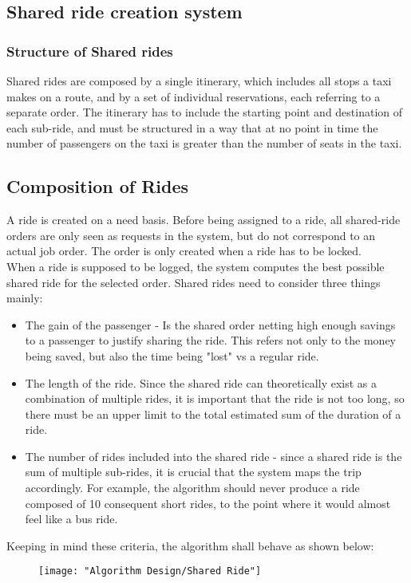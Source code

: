 \newpage
\subsection{Shared ride creation system}
	\subsubsection{Structure of Shared rides}
		Shared rides are composed by a single itinerary, which includes all stops a taxi makes on a route, and by a set of individual reservations, each referring to a separate order.
		The itinerary has to include the starting point and destination of each sub-ride, and must be structured in a way that at no point in time the number of passengers on the taxi is greater than
		the number of seats in the taxi.\\
	\subsection{Composition of Rides}
		A ride is created on a need basis. Before being assigned to a ride, all shared-ride orders are only seen as requests in the system, but do not correspond to an actual job order.
		The order is only created when a ride has to be locked.\\
		When a ride is supposed to be logged, the system computes the best possible shared ride for the selected order. Shared rides need to consider three things mainly:
		\begin{itemize}
		\item The gain of the passenger - Is the shared order netting high enough savings to a passenger to justify sharing the ride. This refers not only to the money being saved, but
		also the time being "lost" vs a regular ride.
		\item The length of the ride. Since the shared ride can theoretically exist as a combination of multiple rides, it is important that the ride is not too long, so there must be an upper limit
		to the total estimated sum of the duration of a ride.
		\item The number of rides included into the shared ride - since a shared ride is the sum of multiple sub-rides, it is crucial that the system maps the trip accordingly. For example, the algorithm
		should never produce a ride composed of 10 consequent short rides, to the point where it would almost feel like a bus ride.
		\end{itemize}
		
		\newpage
		Keeping in mind these criteria, the algorithm shall behave as shown below:
		\begin{figure}[h!]
			\texttt{[image: "Algorithm Design/Shared Ride"]}
		\end{figure}
		\FloatBarrier